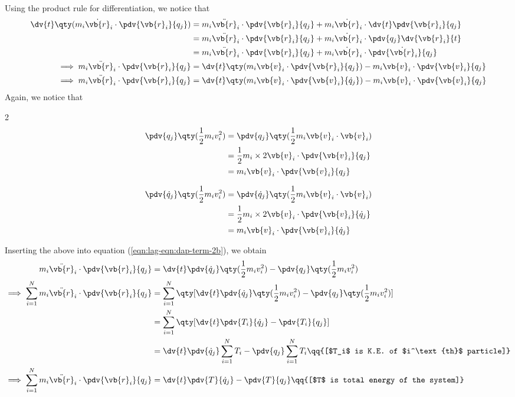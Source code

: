 Using the product rule for differentiation, we notice that
\begin{align}
	\dv{t}\qty(m_i\dot{\vb{r}}_i\cdot\pdv{\vb{r}_i}{q_j})&=m_i\ddot{\vb{r}}_i\cdot\pdv{\vb{r}_i}{q_j}+m_i\dot{\vb{r}}_i\cdot\dv{t}\pdv{\vb{r}_i}{q_j} \nonumber\\
	&=m_i\ddot{\vb{r}}_i\cdot\pdv{\vb{r}_i}{q_j}+m_i\dot{\vb{r}}_i\cdot\pdv{q_j}\dv{\vb{r}_i}{t} \nonumber\\
	&=m_i\ddot{\vb{r}}_i\cdot\pdv{\vb{r}_i}{q_j}+m_i\dot{\vb{r}}_i\cdot\pdv{\dot{\vb{r}}_i}{q_j} \nonumber\\
	\implies m_i\ddot{\vb{r}}_i\cdot\pdv{\vb{r}_i}{q_j}&=\dv{t}\qty(m_i\vb{v}_i\cdot\pdv{\vb{r}_i}{q_j})-m_i\vb{v}_i\cdot\pdv{\vb{v}_i}{q_j} \nonumber\\
	\implies m_i\ddot{\vb{r}}_i\cdot\pdv{\vb{r}_i}{q_j}&=\dv{t}\qty(m_i\vb{v}_i\cdot\pdv{\vb{v}_i}{\dot{q}_j})-m_i\vb{v}_i\cdot\pdv{\vb{v}_i}{q_j} \label{eqn:lag-eqn:dap-term-2b}
\end{align}
Again, we notice that
\begin{multicols}{2}
	\setlength{\columnseprule}{0.4pt}
	\begin{align*}
		\pdv{q_j}\qty(\dfrac{1}{2}m_iv_i^2)&=\pdv{q_j}\qty(\dfrac{1}{2}m_i\vb{v}_i\cdot\vb{v}_i) \\
		&=\dfrac{1}{2}m_i\times 2\vb{v}_i\cdot\pdv{\vb{v}_i}{q_j} \\
		&=m_i\vb{v}_i\cdot\pdv{\vb{v}_i}{q_j}
	\end{align*}
	
	\columnbreak
	
	\begin{align*}
		\pdv{\dot{q}_j}\qty(\dfrac{1}{2}m_iv_i^2)&=\pdv{\dot{q}_j}\qty(\dfrac{1}{2}m_i\vb{v}_i\cdot\vb{v}_i) \\
		&=\dfrac{1}{2}m_i\times 2\vb{v}_i\cdot\pdv{\vb{v}_i}{\dot{q}_j} \\
		&=m_i\vb{v}_i\cdot\pdv{\vb{v}_i}{\dot{q}_j}
	\end{align*}
	
\end{multicols}
Inserting the above into equation (\ref{eqn:lag-eqn:dap-term-2b}), we obtain
\begin{align}
	m_i\ddot{\vb{r}}_i\cdot\pdv{\vb{r}_i}{q_j}&=\dv{t}\pdv{\dot{q}_j}\qty(\dfrac{1}{2}m_iv_i^2)-\pdv{q_j}\qty(\dfrac{1}{2}m_iv_i^2) \nonumber\\
	\implies\sum_{i=1}^{N}{m_i\ddot{\vb{r}}_i\cdot\pdv{\vb{r}_i}{q_j}}&=\sum_{i=1}^{N}{\qty[\dv{t}\pdv{\dot{q}_j}\qty(\dfrac{1}{2}m_iv_i^2)-\pdv{q_j}\qty(\dfrac{1}{2}m_iv_i^2)]} \nonumber\\
	&=\sum_{i=1}^{N}{\qty[\dv{t}\pdv{T_i}{\dot{q}_j}-\pdv{T_i}{q_j}]} \nonumber\\
	&=\dv{t}\pdv{\dot{q}_j}\sum_{i=1}^{N}{T_i}-\pdv{q_j}\sum_{i=1}^{N}{T_i}\qq{[$T_i$ is K.E. of $i^\text{th}$ particle]} \nonumber\\
	\implies \sum_{i=1}^{N}{m_i\ddot{\vb{r}}_i\cdot\pdv{\vb{r}_i}{q_j}}&=\dv{t}\pdv{T}{\dot{q}_j}-\pdv{T}{q_j} \qq{[$T$ is total energy of the system]} \label{eqn:lag-eqn:dap-term-2c}
\end{align}
